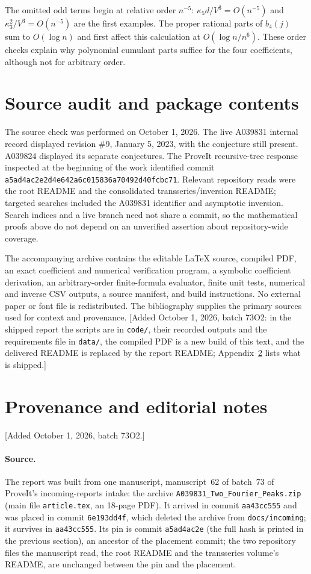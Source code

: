 \documentclass[11pt,a4paper]{article}
\numberwithin{equation}{section}
\theoremstyle{definition}\newtheorem{definition}[theorem]{Definition}
\theoremstyle{remark}\newtheorem{remark}[theorem]{Remark}
\begin{document}
The omitted odd terms begin at relative order $n^{-5}$:
$\kappa_5d/V^3=O(n^{-5})$ and
$\kappa_3^2/V^3=O(n^{-5})$ are the first examples.
The proper rational parts of $b_4(j)$ sum to $O(\log n)$ and first
affect this calculation at $O(\log n/n^6)$.
These order checks explain why polynomial cumulant parts suffice for
the four coefficients, although not for arbitrary order.

\section{Source audit and package contents}
The source check was performed on October 1, 2026. The live A039831
internal record displayed revision \#9, January 5, 2023, with the
conjecture still present. A039824 displayed its separate conjectures.
The ProveIt recursive-tree response inspected at the beginning of the
work identified commit
\texttt{a5ad4ac2e2d4e642a6c015836a70492d40fcbc71}.
Relevant repository reads were the root README and the consolidated
transseries/inversion README; targeted searches included the A039831
identifier and asymptotic inversion. Search indices and a live branch
need not share a commit, so the mathematical proofs above do not depend
on an unverified assertion about repository-wide coverage.

The accompanying archive contains the editable \LaTeX{} source, compiled
PDF, an exact coefficient and numerical verification program, a symbolic
coefficient derivation, an arbitrary-order finite-formula evaluator,
finite unit tests, numerical and inverse CSV
outputs, a source manifest, and build instructions. No external paper
or font file is redistributed. The bibliography supplies the primary
sources used for context and provenance.
[Added October 1, 2026, batch 73O2: in the shipped report the scripts are in
\texttt{code/}, their recorded outputs and the requirements file in
\texttt{data/}, the compiled PDF is a new build of this text, and the
delivered README is replaced by the report README;
Appendix~\ref{tfp:app:provenance} lists what is shipped.]

\section{Provenance and editorial notes}\label{tfp:app:provenance}
[Added October 1, 2026, batch 73O2.]

\paragraph{Source.}
The report was built from one manuscript, manuscript~62 of batch~73 of
ProveIt's incoming-reports intake: the archive
\texttt{A039831\_Two\_Fourier\_Peaks.zip} (main file \texttt{article.tex},
an 18-page PDF). It arrived in commit \texttt{aa43cc555} and was placed in
commit \texttt{6e193dd4f}, which deleted the archive from
\texttt{docs/incoming}; it survives in \texttt{aa43cc555}. Its pin is
commit \texttt{a5ad4ac2e} (the full hash is printed in the previous
section), an ancestor of the placement commit; the two repository files the
manuscript read, the root README and the transseries volume's README, are
unchanged between the pin and the placement.
\end{document}
